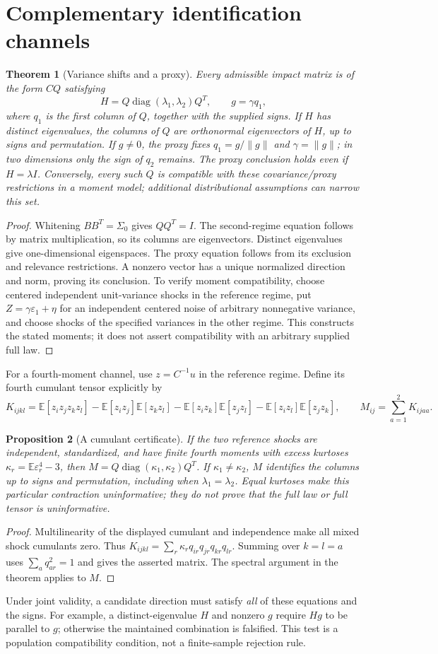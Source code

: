 \documentclass[11pt,a4paper]{article}
\newtheorem{theorem}{Theorem}[section]
\newtheorem{proposition}[theorem]{Proposition}
\theoremstyle{definition}
\theoremstyle{remark}
\newcommand{\E}{\mathbb{E}}
\DeclareMathOperator{\diag}{diag}
\begin{document}
\section{Complementary identification channels}
\begin{theorem}[Variance shifts and a proxy]
Every admissible impact matrix is of the form $CQ$ satisfying
\[
 H=Q\diag(\lambda_1,\lambda_2)Q^T,\qquad g=\gamma q_1,
\]
where $q_1$ is the first column of $Q$, together with the supplied signs. If $H$ has distinct eigenvalues, the columns of $Q$ are orthonormal eigenvectors of $H$, up to signs and permutation. If $g\ne0$, the proxy fixes $q_1=g/\|g\|$ and $\gamma=\|g\|$; in two dimensions only the sign of $q_2$ remains. The proxy conclusion holds even if $H=\lambda I$. Conversely, every such $Q$ is compatible with these covariance/proxy restrictions in a moment model; additional distributional assumptions can narrow this set.
\end{theorem}
\begin{proof}
Whitening $BB^T=\Sigma_0$ gives $QQ^T=I$. The second-regime equation follows by matrix multiplication, so its columns are eigenvectors. Distinct eigenvalues give one-dimensional eigenspaces. The proxy equation follows from its exclusion and relevance restrictions. A nonzero vector has a unique normalized direction and norm, proving its conclusion. To verify moment compatibility, choose centered independent unit-variance shocks in the reference regime, put $Z=\gamma\varepsilon_1+\eta$ for an independent centered noise of arbitrary nonnegative variance, and choose shocks of the specified variances in the other regime. This constructs the stated moments; it does not assert compatibility with an arbitrary supplied full law.
\end{proof}
For a fourth-moment channel, use $z=C^{-1}u$ in the reference regime. Define its fourth cumulant tensor explicitly by
\[
 K_{ijkl}=\E[z_i z_j z_k z_l]
       -\E[z_i z_j]\E[z_k z_l]
       -\E[z_i z_k]\E[z_j z_l]
       -\E[z_i z_l]\E[z_j z_k],
 \qquad M_{ij}=\sum_{a=1}^2 K_{ijaa}.
\]
\begin{proposition}[A cumulant certificate]
If the two reference shocks are independent, standardized, and have finite fourth moments with excess kurtoses $\kappa_r=\E\varepsilon_r^4-3$, then
$M=Q\diag(\kappa_1,\kappa_2)Q^T$.
If $\kappa_1\ne\kappa_2$, $M$ identifies the columns up to signs and permutation, including when $\lambda_1=\lambda_2$. Equal kurtoses make this particular contraction uninformative; they do not prove that the full law or full tensor is uninformative.
\end{proposition}
\begin{proof}
Multilinearity of the displayed cumulant and independence make all mixed shock cumulants zero. Thus
$K_{ijkl}=\sum_r\kappa_r q_{ir}q_{jr}q_{kr}q_{lr}$.
Summing over $k=l=a$ uses $\sum_aq_{ar}^2=1$ and gives the asserted matrix. The spectral argument in the theorem applies to $M$.
\end{proof}
Under joint validity, a candidate direction must satisfy \emph{all} of these equations and the signs. For example, a distinct-eigenvalue $H$ and nonzero $g$ require $Hg$ to be parallel to $g$; otherwise the maintained combination is falsified. This test is a population compatibility condition, not a finite-sample rejection rule.
\end{document}
